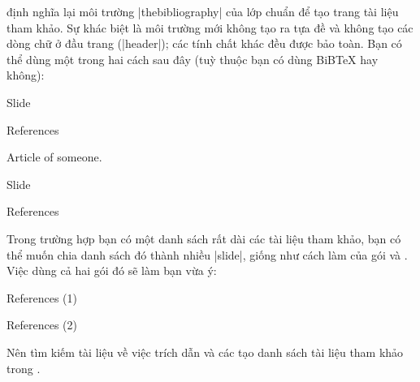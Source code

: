 định nghĩa lại môi trường |thebibliography| của lớp chuẩn 
để tạo trang tài liệu tham khảo. Sự khác biệt là môi trường mới không
tạo ra tựa đề và không tạo các dòng chữ ở đầu trang (|header|); các
tính chất khác đều được bảo toàn. Bạn có thể dùng một trong hai cách
sau đây (tuỳ thuộc bạn có dùng BiB\TeX{} hay không):\\
\begin{minipage}[t]{.49\linewidth}
\begin{example}
 \begin{slide}{Slide}
   \cite{someone}
  \end{slide}
 \begin{slide}{References}
   \begin{thebibliography}{1}
    Article of someone.
   \end{thebibliography}
 \end{slide}
\end{example}
\end{minipage}\hfill
\begin{minipage}[t]{.49\linewidth}
\begin{example}
 \begin{slide}{Slide}
   \cite{someone}
 \end{slide}
 \begin{slide}{References}
   
   
 \end{slide}
\end{example}
\end{minipage}

Trong trường hợp bạn có một danh sách rất dài các tài liệu tham khảo,
bạn có thể muốn chia danh sách đó thành nhiều |slide|, giống như cách làm
của gói  và  \cite{natbib}. Việc dùng cả hai
gói đó sẽ làm bạn vừa ý:
\begin{example}
 \begin{slide}{References (1)}
   
 \end{slide}
 \begin{slide}{References (2)}
 \end{slide}
\end{example}
Nên tìm kiếm tài liệu về việc trích dẫn và các tạo danh sách
tài liệu tham khảo trong \cite{companion}.

